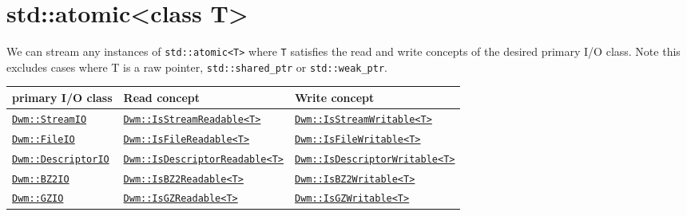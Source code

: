 \begin{minipage}{\textwidth}
\section{\ttfamily std::atomic<class T>}
We can stream any instances of \texttt{std::atomic<T>} where
\texttt{T} satisfies the read and write concepts of the desired
primary I/O class.  Note this excludes cases where T is a raw
pointer, \texttt{std::shared\_ptr} or \texttt{std::weak\_ptr}.
\vspace{1ex}

\begin{tabular}{lll}
  \textbf{primary I/O class} & \textbf{Read concept} & \textbf{Write concept} \\ \hline
  \hyperref[section:DwmStreamIOClass]{\texttt{Dwm::StreamIO}} & \hyperref[concept:DwmIsStreamReadable]{\texttt{Dwm::IsStreamReadable<T>}} & \hyperref[concept:DwmIsStreamWritable]{\texttt{Dwm::IsStreamWritable<T>}} \\
  \hyperref[section:DwmFileIOClass]{\texttt{Dwm::FileIO}} & \hyperref[concept:DwmIsFileReadable]{\texttt{Dwm::IsFileReadable<T>}} & \hyperref[concept:DwmIsFileWritable]{\texttt{Dwm::IsFileWritable<T>}} \\
  \hyperref[section:DwmDescriptorIOClass]{\texttt{Dwm::DescriptorIO}} & \hyperref[concept:DwmIsDescriptorReadable]{\texttt{Dwm::IsDescriptorReadable<T>}} & \hyperref[concept:DwmIsDescriptorWritable]{\texttt{Dwm::IsDescriptorWritable<T>}} \\
  \hyperref[section:DwmBZ2IOClass]{\texttt{Dwm::BZ2IO}} & \hyperref[concept:DwmIsBZ2Readable]{\texttt{Dwm::IsBZ2Readable<T>}} & \hyperref[concept:DwmIsBZ2Writable]{\texttt{Dwm::IsBZ2Writable<T>}} \\
  \hyperref[section:DwmGZIOClass]{\texttt{Dwm::GZIO}} & \hyperref[concept:DwmIsGZReadable]{\texttt{Dwm::IsGZReadable<T>}} & \hyperref[concept:DwmIsGZWritable]{\texttt{Dwm::IsGZWritable<T>}} \\
\end{tabular}
\end{minipage}

